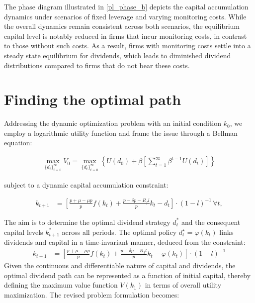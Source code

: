 \documentclass[12pt]{report}
\begin{document}
The phase diagram illustrated in \ref{pl_phase_b} depicts the capital accumulation dynamics under scenarios of fixed
leverage and varying monitoring costs. While the overall dynamics remain consistent across both scenarios, the
equilibrium capital level is notably reduced in firms that incur monitoring costs, in contrast to those without such
costs. As a result, firms with monitoring costs settle into a steady state equilibrium for dividends, which
leads to diminished dividend distributions compared to firms that do not bear these costs. 

\section{Finding the optimal path}
 Addressing the dynamic optimization problem with an initial condition \(k_0\), we employ a logarithmic utility function
 and frame the issue through a Bellman equation:


 \begin{align*}
     \max _{\{d_t\}_{t=0}^{\infty}} V_0 = \max _{\{d_t\}_{t=0}^{\infty}} \left\{U(d_0) + \beta \left[\sum_{t=1}^{\infty} \beta^{t-1} U(d_t)\right]\right\}
 \end{align*}


 subject to a dynamic capital accumulation constraint:

 \begin{align*}
    k_{t+1} &= \left[ \frac{p + \mu - \mu p}{p}f(k_{t}) + \frac{p - \delta p - R_f l}{p} k_{t}  - d_{t} \right] \cdot \left(1-l\right)^{-1} \, \forall t,
\end{align*}

 The aim is to determine the optimal dividend strategy \(d_t^*\) and the consequent capital levels \(k_{t+1}^*\) across
 all periods. The optimal policy \(d_t^{\star}=\varphi(k_t)\) links dividends and capital in a time-invariant manner, deduced from the
 constraint:
 \begin{align*}
    k_{t+1} &= \left[ \frac{p + \mu - \mu p}{p}f(k_{t}) + \frac{p - \delta p - R_f l}{p} k_{t}  - \varphi(k_{t}) \right] \cdot \left(1-l\right)^{-1} 
\end{align*}
 Given the continuous and differentiable nature of capital and dividends, the optimal dividend path can be represented as
 a function of initial capital, thereby defining the maximum value function \(V(k_1)\) in terms of overall utility
 maximization. The revised problem formulation becomes:
\end{document}
